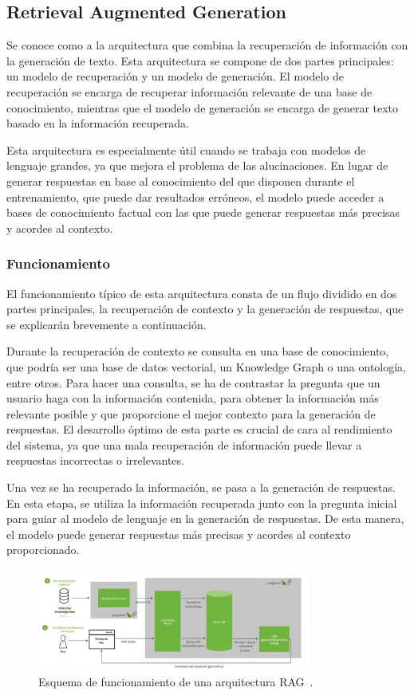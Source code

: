 \subsection{Retrieval Augmented Generation}
Se conoce como  a la arquitectura que combina la recuperación de información con la generación de texto. Esta arquitectura se compone de dos partes principales: un modelo de recuperación y un modelo de generación. El modelo de recuperación se encarga de recuperar información relevante de una base de conocimiento, mientras que el modelo de generación se encarga de generar texto basado en la información recuperada.

Esta arquitectura es especialmente útil cuando se trabaja con modelos de lenguaje grandes, ya que mejora el problema de las alucinaciones. En lugar de generar respuestas en base al conocimiento del que disponen durante el entrenamiento, que puede dar resultados erróneos, el modelo puede acceder a bases de conocimiento factual con las que puede generar respuestas más precisas y acordes al contexto.

\subsubsection{Funcionamiento}
El funcionamiento típico de esta arquitectura consta de un flujo dividido en dos partes principales, la recuperación de contexto y la generación de respuestas, que se explicarán brevemente a continuación.

Durante la recuperación de contexto se consulta en una base de conocimiento, que podría ser una base de datos vectorial, un Knowledge Graph o una ontología, entre otros. Para hacer una consulta, se ha de contrastar la pregunta que un usuario haga con la información contenida, para obtener la información más relevante posible y que proporcione el mejor contexto para la generación de respuestas. El desarrollo óptimo de esta parte es crucial de cara al rendimiento del sistema, ya que una mala recuperación de información puede llevar a respuestas incorrectas o irrelevantes.

Una vez se ha recuperado la información, se pasa a la generación de respuestas. En esta etapa, se utiliza la información recuperada junto con la pregunta inicial para guiar al modelo de lenguaje en la generación de respuestas. De esta manera, el modelo puede generar respuestas más precisas y acordes al contexto proporcionado.

\begin{figure}[!h]
    \centering
    \includegraphics[width=0.8\textwidth]{images/rag.jpg}
    \caption{Esquema de funcionamiento de una arquitectura RAG~\cite{nvidiaBlog}.}
    \label{fig:rag}
\end{figure}